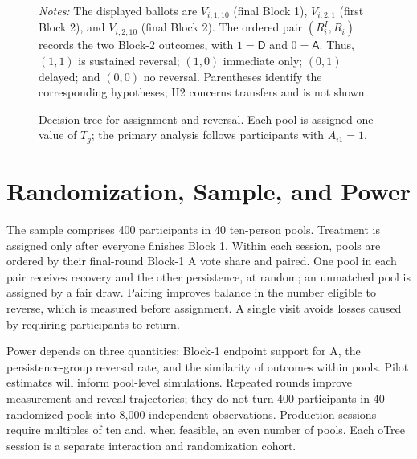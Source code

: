 \documentclass[11pt,a4paper]{article}
\newcommand{\Dproc}{\textsf{D}}
\newcommand{\Aproc}{\textsf{A}}
\begin{document}
\begin{figure}[H]
\caption{Decision tree for assignment and reversal. Each pool is assigned one value of $T_g$; the primary analysis follows participants with $A_{i1}=1$.}
\label{fig:decision-timeline}
\begin{minipage}{0.96\textwidth}
\footnotesize\emph{Notes:} The displayed ballots are $V_{i,1,10}$ (final Block 1), $V_{i,2,1}$ (first Block 2), and $V_{i,2,10}$ (final Block 2). The ordered pair $(R_i^{I},R_i)$ records the two Block-2 outcomes, with $1=\Dproc$ and $0=\Aproc$. Thus, $(1,1)$ is sustained reversal; $(1,0)$ immediate only; $(0,1)$ delayed; and $(0,0)$ no reversal. Parentheses identify the corresponding hypotheses; H2 concerns transfers and is not shown.
\end{minipage}
\end{figure}

\section{Randomization, Sample, and Power}

The sample comprises 400 participants in 40 ten-person pools. Treatment is assigned only after everyone finishes Block 1. Within each session, pools are ordered by their final-round Block-1 \Aproc{} vote share and paired. One pool in each pair receives recovery and the other persistence, at random; an unmatched pool is assigned by a fair draw. Pairing improves balance in the number eligible to reverse, which is measured before assignment. A single visit avoids losses caused by requiring participants to return.

Power depends on three quantities: Block-1 endpoint support for \Aproc{}, the persistence-group reversal rate, and the similarity of outcomes within pools. Pilot estimates will inform pool-level simulations. Repeated rounds improve measurement and reveal trajectories; they do not turn 400 participants in 40 randomized pools into 8,000 independent observations. Production sessions require multiples of ten and, when feasible, an even number of pools. Each oTree session is a separate interaction and randomization cohort.
\end{document}
